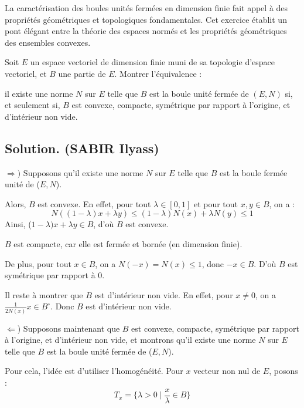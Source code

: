 La caract{\'e}risation des boules unit{\'e}s ferm{\'e}es en dimension finie
fait appel {\`a} des propri{\'e}t{\'e}s g{\'e}om{\'e}triques et topologiques
fondamentales. Cet exercice {\'e}tablit un pont {\'e}l{\'e}gant entre la
th{\'e}orie des espaces norm{\'e}s et les propri{\'e}t{\'e}s
g{\'e}om{\'e}triques des ensembles convexes.
\begin{exercise}[]
Soit $E$ un espace vectoriel de dimension finie muni de sa topologie d'espace
vectoriel, et $B$ une partie de $E$. Montrer l'{\'e}quivalence :

il existe une norme $N$ sur $E$ telle que $B$ est la boule unit{\'e}
ferm{\'e}e de $(E, N)$ si, et seulement si, $B$ est convexe, compacte,
sym{\'e}trique par rapport {\`a} l'origine, et d'int{\'e}rieur non vide.

\end{exercise}

\subsection*{Solution. (SABIR Ilyass)}

$\Longrightarrow)$ Supposons qu'il existe une norme $N$ sur $E$ telle que $B$
est la boule ferm{\'e}e unit{\'e} de ($E, N$).

Alors, $B$ est convexe. En effet, pour tout $\lambda \in [0, 1]$ et pour tout
$x, y \in B$, on a :
\[ N ((1 - \lambda) x + \lambda y) \leq (1 - \lambda) N (x) + \lambda N (y)
   \leq 1 \]
Ainsi, ($1 - \lambda) x + \lambda y \in B$, d'o{\`u} $B$ est convexe.

$B$ est compacte, car elle est ferm{\'e}e et born{\'e}e (en dimension finie).

De plus, pour tout $x \in B$, on a $N (- x) = N (x) \leq 1$, donc $- x \in B$.
D'o{\`u} $B$ est sym{\'e}trique par rapport {\`a} $0$.

Il reste {\`a} montrer que $B$ est d'int{\'e}rieur non vide. En effet, pour $x
\neq 0$, on a $\frac{1}{2 N (x)} x \in B^{\circ}$. Donc $B$ est
d'int{\'e}rieur non vide.

$\Longleftarrow$) Supposons maintenant que $B$ est convexe, compacte,
sym{\'e}trique par rapport {\`a} l'origine, et d'int{\'e}rieur non vide, et
montrons qu'il existe une norme $N$ sur $E$ telle que $B$ est la boule
unit{\'e} ferm{\'e}e de ($E, N$).

Pour cela, l'id{\'e}e est d'utiliser l'homog{\'e}n{\'e}it{\'e}. Pour $x$
vecteur non nul de $E$, posons :
\[ T_x =\{\lambda > 0 \mid \frac{x}{\lambda} \in B\} \]


